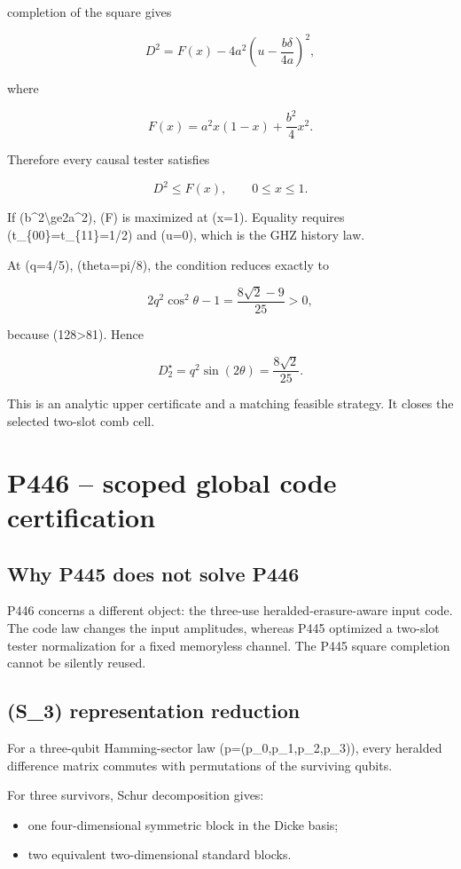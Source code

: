 \documentclass[11pt,a4paper,openany]{report}
\begin{document}
completion of the square gives

\[
D^2
=F(x)-4a^2
\left(u-\frac{b\delta}{4a}\right)^2,
\]

where

\[
F(x)=a^2x(1-x)+\frac{b^2}{4}x^2.
\]

Therefore every causal tester satisfies

\[
D^2\le F(x),\qquad0\le x\le1.
\]

If (b\textasciicircum{}2\textbackslash{}ge2a\textasciicircum{}2), (F) is maximized at (x=1). Equality requires (t\_\{00\}=t\_\{11\}=1/\allowbreak{}2) and (u=0), which is the GHZ history law.

At (q=4/\allowbreak{}5), (theta=pi/\allowbreak{}8), the condition reduces exactly to

\[
2q^2\cos^2\theta-1
=\frac{8\sqrt2-9}{25}>0,
\]

because (128>81). Hence

\[
D_2^\star=q^2\sin(2\theta)=\frac{8\sqrt2}{25}.
\]

This is an analytic upper certificate and a matching feasible strategy. It closes the selected two-slot comb cell.

\chapter{P446 -- scoped global code certification}

\section{Why P445 does not solve P446}

P446 concerns a different object: the three-use heralded-erasure-aware input code. The code law changes the input amplitudes, whereas P445 optimized a two-slot tester normalization for a fixed memoryless channel. The P445 square completion cannot be silently reused.

\section{(S\_3) representation reduction}

For a three-qubit Hamming-sector law (p=(p\_0,p\_1,p\_2,p\_3)), every heralded difference matrix commutes with permutations of the surviving qubits.

For three survivors, Schur decomposition gives:

\begin{itemize}
\item 
one four-dimensional symmetric block in the Dicke basis;

\item 
two equivalent two-dimensional standard blocks.

\end{itemize}
\end{document}
